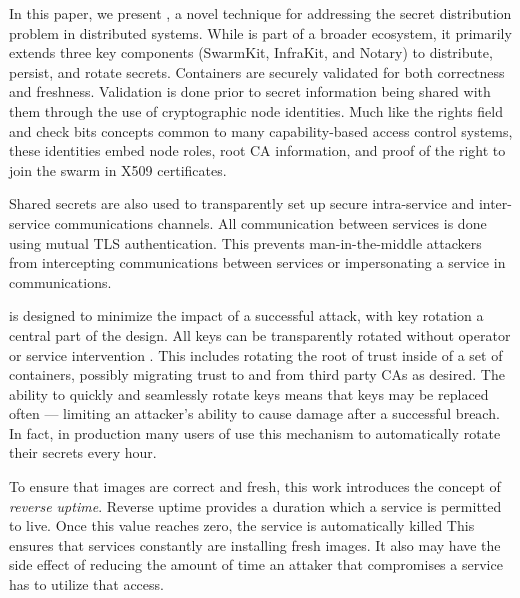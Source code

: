 %




In this paper, we present \sysname, a novel technique for addressing
the secret distribution problem in distributed systems.  While
\sysname is part of a broader ecosystem, it primarily extends three key 
components (SwarmKit, InfraKit, and Notary) to distribute, persist, and 
rotate secrets.  Containers are securely validated for both correctness and
freshness.  Validation is done prior to secret information being shared with 
them through the use of cryptographic node
identities.  Much like the rights field and check bits concepts common
to many capability-based access control systems, these identities embed
node roles, root CA information, and proof of the right to join the swarm
in X509 certificates.  

Shared secrets are also used to transparently set up secure intra-service 
and inter-service communications channels.  All communication between
services  is done using mutual
TLS authentication.  This prevents man-in-the-middle attackers from
intercepting communications between services or impersonating a service
in communications.  

\sysname is designed to minimize the impact of a successful attack, with
key rotation a central part of the design.  All keys can be transparently
rotated without operator or service intervention .  
This includes rotating the root of trust inside of a set of containers,
possibly migrating trust to and from third party CAs as desired.   The
ability to quickly and seamlessly rotate keys  means that keys may be 
replaced often --- limiting an attacker's ability to cause damage after 
a successful breach.  In fact, in production many users of \sysname
use this mechanism to automatically rotate their secrets every hour.


To ensure that images are correct and fresh, this work introduces the 
concept of \emph{reverse uptime}.  Reverse uptime provides a duration which
a service is permitted to live.  Once this value reaches zero, the service
is automatically killed   This ensures that services constantly are installing fresh
images.  It also may have the side effect of reducing the amount of time an
attaker that compromises a service has to utilize that access.

